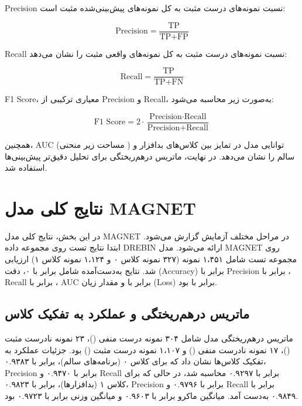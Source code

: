 Precision نسبت نمونه‌های درست مثبت به کل نمونه‌های پیش‌بینی‌شده مثبت است:

\begin{equation}
\text{Precision} = \frac{\text{TP}}{\text{TP} + \text{FP}}
\end{equation}

Recall نسبت نمونه‌های درست مثبت به کل نمونه‌های واقعی مثبت را نشان می‌دهد:

\begin{equation}
\text{Recall} = \frac{\text{TP}}{\text{TP} + \text{FN}}
\end{equation}

F1 Score، معیاری ترکیبی از Precision و Recall، به‌صورت زیر محاسبه می‌شود:

\begin{equation}
\text{F1 Score} = 2 \cdot \frac{\text{Precision} \cdot \text{Recall}}{\text{Precision} + \text{Recall}}
\end{equation}

همچنین، AUC (مساحت زیر منحنی ) توانایی مدل در تمایز بین کلاس‌های بدافزار و سالم را نشان می‌دهد. در نهایت، ماتریس درهم‌ریختگی  برای تحلیل دقیق‌تر پیش‌بینی‌ها استفاده شد.

\section{نتایج کلی مدل MAGNET}
در این بخش، نتایج کلی مدل MAGNET در مراحل مختلف آزمایش گزارش می‌شود. ابتدا نتایج تست روی مجموعه داده DREBIN \cite{Drebin} ارائه می‌شود. مدل MAGNET روی مجموعه تست شامل ۱،۴۵۱ نمونه (۳۲۷ نمونه کلاس ۰ و ۱،۱۲۴ نمونه کلاس ۱) ارزیابی شد. نتایج به‌دست‌آمده شامل  برابر با ۰، دقت (Accuracy) برابر با  Precision برابر با ، Recall برابر با ، AUC برابر با  و مقدار زیان (Loss) برابر با  بود.

\subsection{ماتریس درهم‌ریختگی و عملکرد به تفکیک کلاس}
ماتریس درهم‌ریختگی مدل شامل ۳۰۴ نمونه درست منفی ()، ۲۳ نمونه نادرست مثبت ()، ۱۷ نمونه نادرست منفی () و ۱،۱۰۷ نمونه درست مثبت () بود. جزئیات عملکرد به تفکیک کلاس‌ها نشان داد که برای کلاس ۰ (برنامه‌های سالم)،  برابر با ۰.۹۳۸۳، Precision برابر با ۰.۹۴۷۰ و Recall برابر با ۰.۹۲۹۷ محاسبه شد، در حالی که برای کلاس ۱ (بدافزارها)،  برابر با ۰.۹۸۲۳، Precision برابر با ۰.۹۷۹۶ و Recall برابر با ۰.۹۸۴۹ به‌دست آمد. میانگین ماکرو  برابر با ۰.۹۶۰۳ و میانگین وزنی  برابر با ۰.۹۷۲۳ بود.

